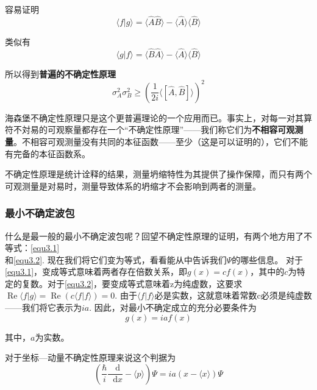 \documentclass[UTF8]{ctexart}
\begin{document}
\noindent 容易证明
\begin{equation}
    \langle f | g \rangle  = \langle \hat{A} \hat{B}\rangle - \langle \hat{A} \rangle \langle \hat{B} \rangle  
\end{equation}

\noindent 类似有
\begin{equation}
    \langle g|f \rangle  = \langle \hat{B}\hat{A} \rangle -\langle \hat{A} \rangle \langle \hat{B} \rangle
\end{equation}

\noindent 所以得到\textbf{普遍的不确定性原理}
\begin{equation}
    \sigma_{A}^{2} \sigma_{B}^{2} \geq\left(\frac{1}{2 i}\langle[\hat{A}, \hat{B}]\rangle\right)^{2} \label{equ3.5}
    \end{equation}

    海森堡不确定性原理只是这个更普遍理论的一个应用而已。事实上，对每一对其算符不対易的可观察量都存在一个“不确定性原理”——我们称它们为\textbf{不相容可观测量}。不相容可观测量没有共同的本征函数——至少（这是可以证明的），它们不能有完备的本征函数系。

    不确定性原理是统计诠释的结果，测量坍缩特性为其提供了操作保障，而只有两个可观测量是对易时，测量导致体系的坍缩才不会影响到两者的测量。

    \subsubsection{最小不确定波包}
    什么是最一般的最小不确定波包呢？回望不确定性原理的证明，有两个地方用了不等式：\autoref{equ3.1}\\
    和\autoref{equ3.2}. 现在我们将它们变为等式，看看能从中告诉我们$\Psi$的哪些信息。
    对于\autoref{equ3.1}，变成等式意味着两者存在倍数关系，即$g(x) = cf(x)$，其中的$c$为特定的复数。对于\autoref{equ3.2}，要变成等式意味着z为纯虚数，这要求$\operatorname{Re} \langle f|g \rangle = \operatorname{Re} \left( c \langle f|f \rangle \right)= 0$. 由于$\langle f|f \rangle $必是实数，这就意味着常数c必须是纯虚数——我们将它表示为$ia$. 因此，对最小不确定成立的充分必要条件为
    \begin{equation}
        g(x) = ia f(x)
    \end{equation}

\noindent 其中，$a$为实数。

    对于坐标—动量不确定性原理来说这个判据为
    \begin{equation}
        \left(\frac{\hbar}{i}\frac{\mathop{}\!\mathrm{d} }{\mathop{}\!\mathrm{d} x} - \langle p \rangle \right) \Psi = ia (x-\langle x \rangle ) \Psi
    \end{equation}
\end{document}
